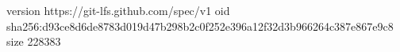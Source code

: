 version https://git-lfs.github.com/spec/v1
oid sha256:d93ce8d6de8783d019d47b298b2c0f252e396a12f32d3b966264c387e867e9c8
size 228383
